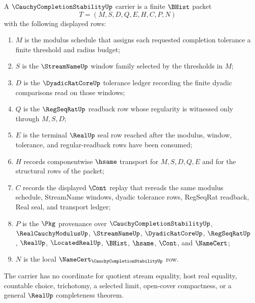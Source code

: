 \begin{definition}
\label{def:cauchy-completion-stability-carrier}
A $\CauchyCompletionStabilityUp$ carrier is a finite $\BHist$ packet
$$
T=(M,S,D,Q,E,H,C,P,N)
$$
with the following displayed rows:
\begin{enumerate}
\item $M$ is the modulus schedule that assigns each requested completion tolerance a finite threshold and radius budget;
\item $S$ is the $\StreamNameUp$ window family selected by the thresholds in $M$;
\item $D$ is the $\DyadicRatCoreUp$ tolerance ledger recording the finite dyadic comparisons read on those windows;
\item $Q$ is the $\RegSeqRatUp$ readback row whose regularity is witnessed only through $M,S,D$;
\item $E$ is the terminal $\RealUp$ seal row reached after the modulus, window, tolerance, and regular-readback rows have been consumed;
\item $H$ records componentwise $\hsame$ transport for $M,S,D,Q,E$ and for the structural rows of the packet;
\item $C$ records the displayed $\Cont$ replay that rereads the same modulus schedule, StreamName windows, dyadic tolerance rows, RegSeqRat readback, Real seal, and transport ledger;
\item $P$ is the $\Pkg$ provenance over $\CauchyCompletionStabilityUp$, $\RealCauchyModulusUp$, $\StreamNameUp$, $\DyadicRatCoreUp$, $\RegSeqRatUp$, $\RealUp$, $\LocatedRealUp$, $\BHist$, $\hsame$, $\Cont$, and $\NameCert$;
\item $N$ is the local $\NameCert_{\CauchyCompletionStabilityUp}$ row.
\end{enumerate}
The carrier has no coordinate for quotient stream equality, host real equality, countable choice, trichotomy, a selected limit, open-cover compactness, or a general $\RealUp$ completeness theorem.
\end{definition}

